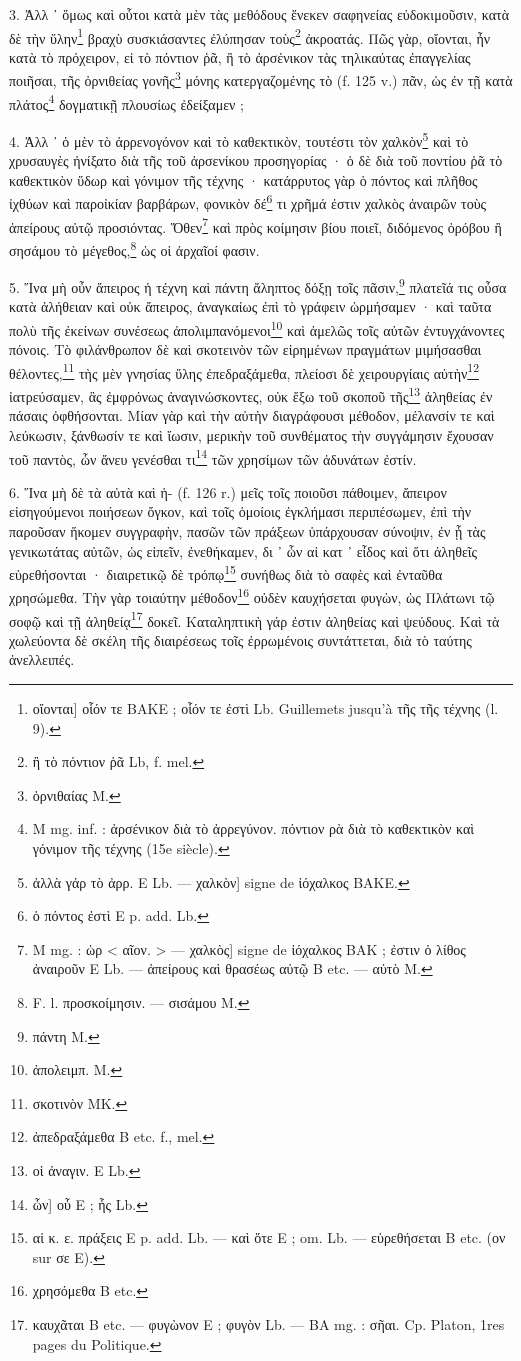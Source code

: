 \documentclass[a4paper, 11pt, oneside, polutonikogreek, french]{article}
\begin{document}
3. Ἀλλ ᾽ ὅμως καὶ οὗτοι κατὰ μὲν τὰς μεθόδους ἕνεκεν σαφηνείας εὐδοκιμοῦσιν, κατὰ δὲ τὴν ὕλην\footnote{οἴονται] οἷόν τε BAKE ; οἷόν τε ἐστὶ Lb. Guillemets jusqu'à τῆς τῆς τέχνης (l. 9).} βραχὺ συσκιάσαντες ἐλύπησαν τοὺς\footnote{ἢ τὸ πόντιον ῥᾶ Lb, f. mel.} ἀκροατάς. Πῶς γὰρ, οἴονται, ἦν κατὰ τὸ πρόχειρον, εἰ τὸ πόντιον ῥᾶ, ἢ τὸ ἀρσένικον τὰς τηλικαύτας ἐπαγγελίας ποιῆσαι, τῆς ὀρνιθείας γονῆς\footnote{ὀρνιθαίας M.} μόνης κατεργαζομένης τὸ (f. 125 v.) πᾶν, ὡς ἐν τῇ κατὰ πλάτος\footnote{M mg. inf. : ἀρσένικον διὰ τὸ ἀρρεγύνον. πόντιον ρὰ διὰ τὸ καθεκτικὸν καὶ γόνιμον τῆς τέχνης (15e siècle).} δογματικῇ πλουσίως ἐδείξαμεν ;

4. Ἀλλ ᾽ ὁ μὲν τὸ ἀρρενογόνον καὶ τὸ καθεκτικὸν, τουτέστι τὸν χαλκὸν\footnote{ἀλλὰ γἀρ τὸ ἀρρ. E Lb. --- χαλκὸν] signe de ἰόχαλκος BAKE.} καὶ τὸ χρυσαυγὲς ἠνίξατο διὰ τῆς τοῦ ἀρσενίκου προσηγορίας · ὁ δὲ διὰ τοῦ ποντίου ῥᾶ τὸ καθεκτικὸν ὕδωρ καὶ γόνιμον τῆς τέχνης · κατάρρυτος γὰρ ὁ πόντος καὶ πλῆθος ἰχθύων καὶ παροἰκίαν βαρβάρων, φονικὸν δέ\footnote{ὁ πόντος ἐστὶ E p. add. Lb.} τι χρῆμά ἐστιν χαλκὸς ἀναιρῶν τοὺς ἀπείρους αὐτῷ προσιόντας. Ὅθεν\footnote{M mg. : ὡρ < αῖον. > --- χαλκὸς] signe de ἰόχαλκος BAK ; ἐστιν ὁ λίθος ἀναιροῦν E Lb. --- ἀπείρους καὶ θρασέως αὐτῷ B etc. --- αὐτὸ M.} καὶ πρὸς κοίμησιν βίου ποιεῖ, διδόμενος ὀρόβου ἢ σησάμου τὸ μέγεθος,\footnote{F. l. προσκοίμησιν. --- σισάμου M.} ὡς οἱ ἀρχαῖοί φασιν.

5. Ἵνα μὴ οὖν ἄπειρος ἡ τέχνη καὶ πάντη ἄληπτος δόξῃ τοῖς πᾶσιν,\footnote{πάντη M.} πλατεῖά τις οὖσα κατὰ ἀλήθειαν καὶ οὐκ ἄπειρος, ἀναγκαίως ἐπὶ τὸ γράφειν ὡρμήσαμεν · καὶ ταῦτα πολὺ τῆς ἐκείνων συνέσεως ἀπολιμπανόμενοι\footnote{ἀπολειμπ. M.} καὶ ἀμελῶς τοῖς αὐτῶν ἐντυγχάνοντες πόνοις. Τὸ φιλάνθρωπον δὲ καὶ σκοτεινὸν τῶν εἰρημένων πραγμάτων μιμήσασθαι θέλοντες,\footnote{σκοτινὸν MK.} τὴς μὲν γνησίας ὕλης ἐπεδραξάμεθα, πλείοσι δὲ χειρουργίαις αὐτὴν\footnote{ἀπεδραξάμεθα B etc. f., mel.} ἰατρεύσαμεν, ἃς ἐμφρόνως ἀναγινώσκοντες, οὐκ ἔξω τοῦ σκοποῦ τῆς\footnote{οἱ ἀναγιν. E Lb.} ἀληθείας ἐν πάσαις ὀφθήσονται. Μίαν γὰρ καὶ τὴν αὐτὴν διαγράφουσι μέθοδον, μέλανσίν τε καὶ λεύκωσιν, ξάνθωσίν τε καὶ ἴωσιν, μερικὴν τοῦ συνθέματος τὴν συγγάμησιν ἔχουσαν τοῦ παντὸς, ὧν ἄνευ γενέσθαι τι\footnote{ὧν] οὗ E ; ἧς Lb.} τῶν χρησίμων τῶν ἀδυνάτων ἐστίν.

6. Ἵνα μὴ δὲ τὰ αὐτὰ καὶ ἡ- (f. 126 r.) μεῖς τοῖς ποιοῦσι πάθοιμεν, ἄπειρον εἰσηγούμενοι ποιήσεων ὄγκον, καὶ τοῖς ὁμοίοις ἐγκλήμασι περιπέσωμεν, ἐπὶ τὴν παροῦσαν ἥκομεν συγγραφὴν, πασῶν τῶν πράξεων ὑπάρχουσαν σύνοψιν, ἐν ᾗ τὰς γενικωτάτας αὐτῶν, ὡς εἰπεῖν, ἐνεθήκαμεν, δι ᾽ ὧν αἱ κατ ᾽ εἶδος καὶ ὅτι ἀληθεῖς εὑρεθήσονται · διαιρετικῷ δὲ τρόπῳ\footnote{αἱ κ. ε. πράξεις E p. add. Lb. --- καὶ ὅτε E ; om. Lb. --- εὑρεθήσεται B etc. (ον sur σε E).} συνήθως διὰ τὸ σαφὲς καὶ ἐνταῦθα χρησώμεθα. Τὴν γὰρ τοιαύτην μέθοδον\footnote{χρησόμεθα B etc.} οὐδὲν καυχήσεται φυγὼν, ὡς Πλάτωνι τῷ σοφῷ καὶ τῇ ἀληθείᾳ\footnote{καυχᾶται B etc. --- φυγὼνον E ; φυγὸν Lb. --- BA mg. : σῆαι. Cp. Platon, 1res pages du Politique.} δοκεῖ. Καταληπτικὴ γάρ ἐστιν ἀληθείας καὶ ψεύδους. Καὶ τὰ χωλεύοντα δὲ σκέλη τῆς διαιρέσεως τοῖς ἐρρωμένοις συντάττεται, διὰ τὸ ταύτης ἀνελλειπές.
\end{document}
